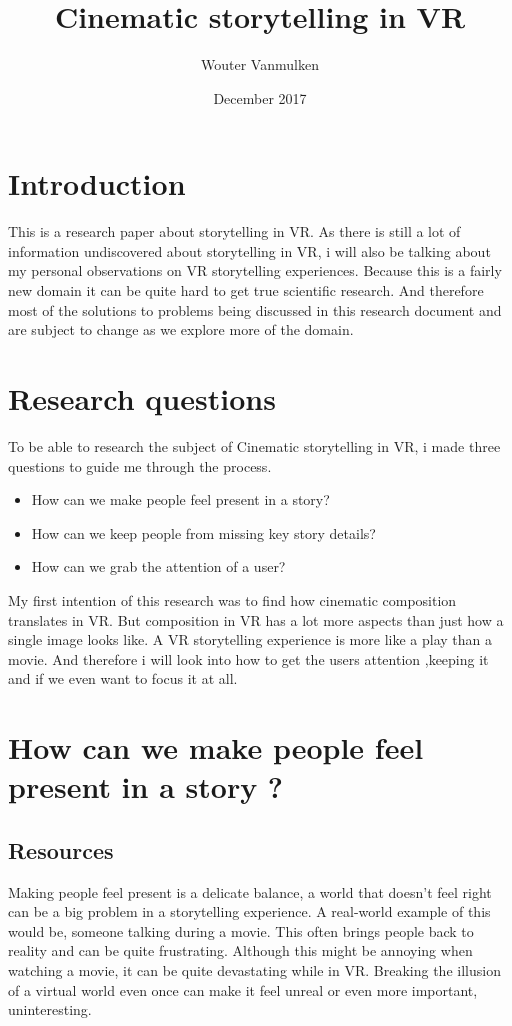 \documentclass{report}
\title{Cinematic storytelling in VR}
\author{Wouter Vanmulken}
\date{December 2017}
\begin{document}
			
				\maketitle
				\tableofcontents
				\newpage
		
				\chapter{Introduction}
				
				This is a research paper about storytelling in VR. As there is still a lot of information undiscovered about storytelling in VR, i will also be talking about my personal observations on VR storytelling experiences. Because this is a fairly new domain it can be quite hard to get true scientific research. And therefore most of the solutions to problems being discussed in this research document and are subject to change as we explore more of the domain.
				
				\chapter{Research questions}
		
				To be able to research the subject of Cinematic storytelling in VR, i made three questions to guide me through the process.
				\begin{itemize}
					\item How can we make people feel present in a story?
					\item How can we keep people from missing key story details?
					\item How can we grab the attention of a user?
				\end{itemize}

				My first intention of this research was to find how cinematic composition translates in VR. But composition in VR has a lot more aspects than just how a single image looks like. A VR storytelling experience is more like a play than a movie. And therefore i will look into how to get the users attention ,keeping it and if we even want to focus it at all.
				

				
				\chapter{How can we make people feel present in a story ?}
				
				\section{Resources}				
				Making people feel present is a delicate balance, a world that doesn't feel right can be a big problem in a storytelling experience. A real-world example of this would be, someone talking during a movie. This often brings people back to reality and can be quite frustrating. Although this might be annoying when watching a movie, it can be quite devastating while in VR. Breaking the illusion of a virtual world even once can make it feel unreal or even more important, uninteresting.
\end{document}
